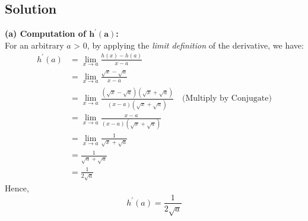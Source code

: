\subsection*{Solution}
\textbf{(a) Computation of \(\mathbf{h^{\prime}(a)}\):}\\
    For an arbitrary $a$ > 0, by applying the \textit{limit definition} of the derivative, we have:
    \begin{equation*}
    \begin{split}
    h^{\prime}(a) & = \lim_{x\to a} \frac{h(x) - h(a)}{x - a} \\
    & = \lim_{x\to a} \frac{\sqrt{x} - \sqrt{a}}{x - a} \\
    & = \lim_{x\to a} \frac{(\sqrt{x} - \sqrt{a})(\sqrt{x} + \sqrt{a})}{(x - a)(\sqrt{x} + \sqrt{a})} \quad \text{(Multiply by Conjugate)} \\
    & = \lim_{x\to a} \frac{x - a}{(x - a)(\sqrt{x} + \sqrt{a})} \\
    & = \lim_{x\to a} \frac{1}{\sqrt{x} + \sqrt{a}} \\
    & = \frac{1}{\sqrt{a} + \sqrt{a}} \\
    & = \frac{1}{2\sqrt{a}}
    \end{split}
    \end{equation*}
    Hence, \[h^{\prime}(a) = \frac{1}{2\sqrt{a}}\]

